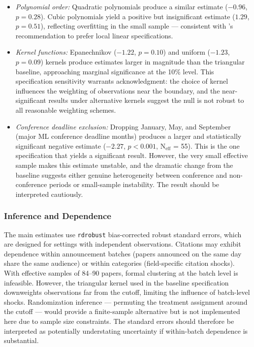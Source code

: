 \documentclass[12pt]{article}
\begin{document}
\begin{itemize}
\item \textit{Polynomial order:} Quadratic polynomials produce a similar estimate ($-0.96$, $p = 0.28$). Cubic polynomials yield a positive but insignificant estimate ($1.29$, $p = 0.51$), reflecting overfitting in the small sample --- consistent with \citet{gelman2019}'s recommendation to prefer local linear specifications.
\item \textit{Kernel functions:} Epanechnikov ($-1.22$, $p = 0.10$) and uniform ($-1.23$, $p = 0.09$) kernels produce estimates larger in magnitude than the triangular baseline, approaching marginal significance at the 10\% level. This specification sensitivity warrants acknowledgment: the choice of kernel influences the weighting of observations near the boundary, and the near-significant results under alternative kernels suggest the null is not robust to all reasonable weighting schemes.
\item \textit{Conference deadline exclusion:} Dropping January, May, and September (major ML conference deadline months) produces a larger and statistically significant negative estimate ($-2.27$, $p < 0.001$, N$_{\text{eff}}$ = 55). This is the one specification that yields a significant result. However, the very small effective sample makes this estimate unstable, and the dramatic change from the baseline suggests either genuine heterogeneity between conference and non-conference periods or small-sample instability. The result should be interpreted cautiously.
\end{itemize}

\subsubsection{Inference and Dependence}

The main estimates use \texttt{rdrobust} bias-corrected robust standard errors, which are designed for settings with independent observations. Citations may exhibit dependence within announcement batches (papers announced on the same day share the same audience) or within categories (field-specific citation shocks). With effective samples of 84--90 papers, formal clustering at the batch level is infeasible. However, the triangular kernel used in the baseline specification downweights observations far from the cutoff, limiting the influence of batch-level shocks. Randomization inference --- permuting the treatment assignment around the cutoff --- would provide a finite-sample alternative but is not implemented here due to sample size constraints. The standard errors should therefore be interpreted as potentially understating uncertainty if within-batch dependence is substantial.
\end{document}
